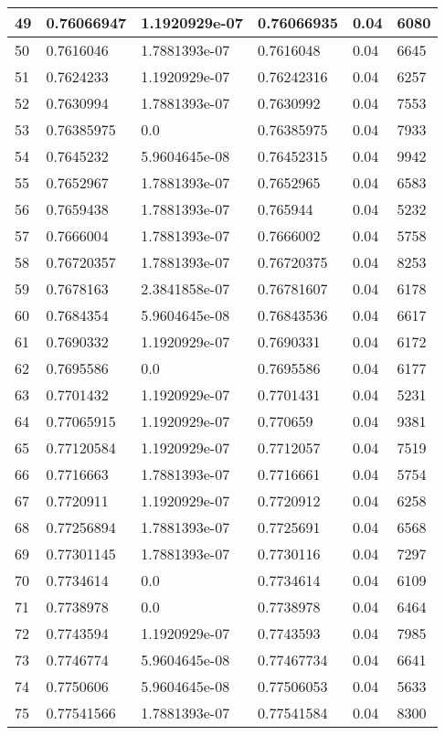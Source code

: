 \begin{longtable}{|l|l|l|l|l|l|}
49 & 0.76066947 & 1.1920929e-07 & 0.76066935 & 0.04 & 6080 \\ \hline 
50 & 0.7616046 & 1.7881393e-07 & 0.7616048 & 0.04 & 6645 \\ \hline 
51 & 0.7624233 & 1.1920929e-07 & 0.76242316 & 0.04 & 6257 \\ \hline 
52 & 0.7630994 & 1.7881393e-07 & 0.7630992 & 0.04 & 7553 \\ \hline 
53 & 0.76385975 & 0.0 & 0.76385975 & 0.04 & 7933 \\ \hline 
54 & 0.7645232 & 5.9604645e-08 & 0.76452315 & 0.04 & 9942 \\ \hline 
55 & 0.7652967 & 1.7881393e-07 & 0.7652965 & 0.04 & 6583 \\ \hline 
56 & 0.7659438 & 1.7881393e-07 & 0.765944 & 0.04 & 5232 \\ \hline 
57 & 0.7666004 & 1.7881393e-07 & 0.7666002 & 0.04 & 5758 \\ \hline 
58 & 0.76720357 & 1.7881393e-07 & 0.76720375 & 0.04 & 8253 \\ \hline 
59 & 0.7678163 & 2.3841858e-07 & 0.76781607 & 0.04 & 6178 \\ \hline 
60 & 0.7684354 & 5.9604645e-08 & 0.76843536 & 0.04 & 6617 \\ \hline 
61 & 0.7690332 & 1.1920929e-07 & 0.7690331 & 0.04 & 6172 \\ \hline 
62 & 0.7695586 & 0.0 & 0.7695586 & 0.04 & 6177 \\ \hline 
63 & 0.7701432 & 1.1920929e-07 & 0.7701431 & 0.04 & 5231 \\ \hline 
64 & 0.77065915 & 1.1920929e-07 & 0.770659 & 0.04 & 9381 \\ \hline 
65 & 0.77120584 & 1.1920929e-07 & 0.7712057 & 0.04 & 7519 \\ \hline 
66 & 0.7716663 & 1.7881393e-07 & 0.7716661 & 0.04 & 5754 \\ \hline 
67 & 0.7720911 & 1.1920929e-07 & 0.7720912 & 0.04 & 6258 \\ \hline 
68 & 0.77256894 & 1.7881393e-07 & 0.7725691 & 0.04 & 6568 \\ \hline 
69 & 0.77301145 & 1.7881393e-07 & 0.7730116 & 0.04 & 7297 \\ \hline 
70 & 0.7734614 & 0.0 & 0.7734614 & 0.04 & 6109 \\ \hline 
71 & 0.7738978 & 0.0 & 0.7738978 & 0.04 & 6464 \\ \hline 
72 & 0.7743594 & 1.1920929e-07 & 0.7743593 & 0.04 & 7985 \\ \hline 
73 & 0.7746774 & 5.9604645e-08 & 0.77467734 & 0.04 & 6641 \\ \hline 
74 & 0.7750606 & 5.9604645e-08 & 0.77506053 & 0.04 & 5633 \\ \hline 
75 & 0.77541566 & 1.7881393e-07 & 0.77541584 & 0.04 & 8300 \\ \hline 
\end{longtable}